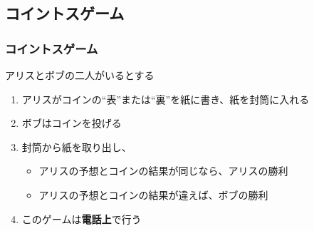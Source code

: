 \subsection{コイントスゲーム}
\begin{frame}[fragile]
  \frametitle{コイントスゲーム}

  \begin{exampleblock}{}
    アリスとボブの二人がいるとする
    \begin{enumerate}
      \item<2-> アリスがコインの``表''または``裏''を紙に書き、紙を封筒に入れる
      \item<3-> ボブはコインを投げる
      \item<4-> 封筒から紙を取り出し、
        \begin{itemize}
          \item アリスの予想とコインの結果が同じなら、アリスの勝利
          \item アリスの予想とコインの結果が違えば、ボブの勝利
        \end{itemize}
      \item<5-> このゲームは\textbf{電話上}で行う
    \end{enumerate}
  \end{exampleblock}

  \begin{center}

  \end{center}
\end{frame}

